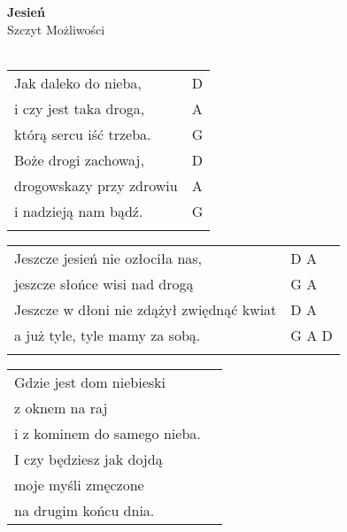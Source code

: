 \documentclass[a5paper]{article}
\begin{document}


\noindent
\fontsize{12pt}{15pt}\selectfont
\textbf{Jesień} \\
\fontsize{8pt}{10pt}\selectfont
Szczyt Możliwości \\ \\
\fontsize{10pt}{12pt}\selectfont
{}
\begin{tabular}{@{}p{8.50cm}p{3cm}@{}}
\noindent
Jak daleko do nieba, & D \\
i czy jest taka droga, & A \\
którą sercu iść trzeba. & G \\
Boże drogi zachowaj, & D \\
drogowskazy przy zdrowiu & A \\
i nadzieją nam bądź. & G \\ \\
\end{tabular}

\noindent
\begin{tabular}{@{}p{7.50cm}p{3cm}@{}}
Jeszcze jesień nie ozłociła nas, & D A \\
jeszcze słońce wisi nad drogą & G A  \\
Jeszcze w dłoni nie zdążył zwiędnąć kwiat & D A \\
a już tyle, tyle mamy za sobą. & G A D \\ \\
\end{tabular}

\noindent
\begin{tabular}{@{}p{8.50cm}p{3cm}@{}}
Gdzie jest dom niebieski \\
z oknem na raj \\
i z kominem do samego nieba. \\
I czy będziesz jak dojdą \\
moje myśli zmęczone \\
na drugim końcu dnia.
\end{tabular}
\end{document}

